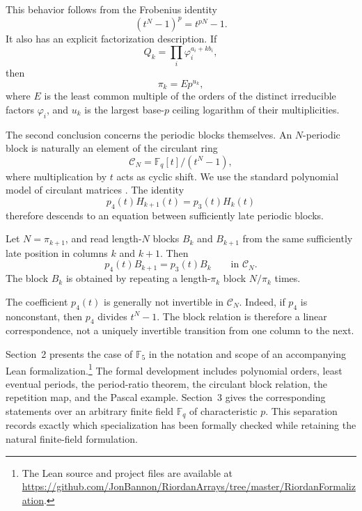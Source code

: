 This behavior follows from the Frobenius identity
\[
(t^N-1)^p=t^{pN}-1.
\]
It also has an explicit factorization description. If
\[
Q_k=\prod_i\varphi_i^{a_i+kb_i},
\]
then
\[
\pi_k=E p^{u_k},
\]
where $E$ is the least common multiple of the orders of the distinct
irreducible factors $\varphi_i$, and $u_k$ is the largest base-$p$ ceiling
logarithm of their multiplicities.

The second conclusion concerns the periodic blocks themselves. An
$N$-periodic block is naturally an element of the circulant ring
\[
\mathcal C_N=\mathbb F_q[t]/(t^N-1),
\]
where multiplication by $t$ acts as cyclic shift. We use the standard
polynomial model of circulant matrices \cite{Davis1979}. The identity
\[
p_4(t)H_{k+1}(t)=p_3(t)H_k(t)
\]
therefore descends to an equation between sufficiently late periodic blocks.

\begin{letterthm}\label{thm:intro-block}
Let $N=\pi_{k+1}$, and read length-$N$ blocks $B_k$ and $B_{k+1}$ from the
same sufficiently late position in columns $k$ and $k+1$. Then
\[
p_4(t)B_{k+1}=p_3(t)B_k
\qquad\text{in }\mathcal C_N.
\]
The block $B_k$ is obtained by repeating a length-$\pi_k$ block
$N/\pi_k$ times.
\end{letterthm}

The coefficient $p_4(t)$ is generally not invertible in $\mathcal C_N$.
Indeed, if $p_4$ is nonconstant, then $p_4$ divides $t^N-1$. The block
relation is therefore a linear correspondence, not a uniquely invertible
transition from one column to the next.

Section~2 presents the case of $\mathbb F_5$ in the notation and scope of an
accompanying Lean formalization.\footnote{The Lean source and project files
are available at
\url{https://github.com/JonBannon/RiordanArrays/tree/master/RiordanFormalization}.}
The formal development includes polynomial
orders, least eventual periods, the period-ratio theorem, the circulant block
relation, the repetition map, and the Pascal example. Section~3 gives the
corresponding statements over an arbitrary finite field $\mathbb F_q$ of
characteristic $p$. This separation records exactly which specialization has
been formally checked while retaining the natural finite-field formulation.
